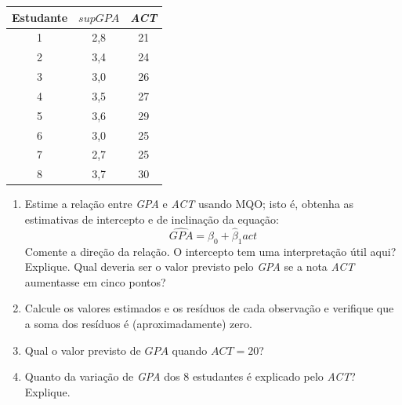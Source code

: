 \documentclass[12pt,letterpaper, onecolumn]{exam}
\begin{document}
\begin{questions}
    \begin{table}[bhtp]
        \centering
        \begin{tabular}{c|cc}
            \toprule
            \midrule
            \multicolumn{1}{c}{Estudante} & $supGPA$  & \textit{ACT} \\
            \midrule
             1 & 2,8 & 21\\
             2 & 3,4 & 24\\
             3 & 3,0 & 26\\
             4 & 3,5 & 27\\
             5 & 3,6 & 29\\
             6 & 3,0 & 25\\
             7 & 2,7 & 25\\
             8 & 3,7 & 30\\
             \midrule
             \bottomrule
        \end{tabular}
    \end{table}
    \begin{enumerate} [label = (\alph*)]
        \item Estime a relação entre \textit{GPA} e \textit{ACT} usando MQO; isto é, obtenha as estimativas de intercepto e de inclinação da equação:\begin{equation*}
            \widehat{GPA} = \hat \beta_0 + \hat \beta_1 act
        \end{equation*} Comente a direção da relação. O intercepto tem uma interpretação útil aqui? Explique. Qual deveria ser o valor previsto pelo \textit{GPA} se a nota \textit{ACT} aumentasse em cinco pontos?
        \item Calcule os valores estimados e os resíduos de cada observação e verifique que a soma dos resíduos é (aproximadamente) zero.
        \item Qual o valor previsto de ${GPA}$ quando $ACT = 20$?
        \item Quanto da variação de \textit{GPA} dos 8 estudantes é explicado pelo \textit{ACT}? Explique.
    \end{enumerate}



\end{questions}
\end{document}
